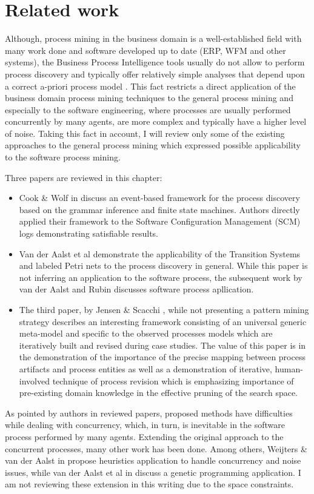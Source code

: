 \chapter{Related work} \label{related.work}
Although, process mining in the business domain is a well-established field with many work done and software developed up to date (ERP, WFM and other systems), the Business Process Intelligence tools usually do not allow to perform process discovery and typically offer relatively simple analyses that depend upon a correct a-priori process model \cite{citeulike:3718014} \cite{citeulike:5044991}. This fact restricts a direct application of the business domain process mining techniques to the general process mining and especially to the software engineering, where processes are usually performed concurrently by many agents, are more complex and typically have a higher level of noise. Taking this fact in account, I will review only some of the existing approaches to the general process mining which expressed possible applicability to the software process mining. 

Three papers are reviewed in this chapter: 
\begin{itemize}
	\item Cook \& Wolf in \cite{citeulike:328044} discuss an event-based framework for the process discovery based on the grammar inference and finite state machines. Authors directly applied their framework to the Software Configuration Management (SCM) logs demonstrating satisfiable results. 
	\item Van der Aalst et al \cite{citeulike:3718014} demonstrate the applicability of the Transition Systems and labeled Petri nets to the process discovery in general. While this paper is not inferring an application to the software process, the subsequent work by van der Aalst and Rubin \cite{citeulike:1885717} discusses software process apllication.
	\item The third paper, by Jensen \& Scacchi \cite{citeulike:5043664}, while not presenting a pattern mining strategy describes an interesting framework consisting of an universal generic meta-model and specific to the observed processes models which are iteratively built and revised during case studies. The value of this paper is in the demonstration of the importance of the precise mapping between process artifacts and process entities as well as a demonstration of iterative, human-involved technique of process revision which is emphasizing importance of pre-existing domain knowledge in the effective pruning of the search space.
\end{itemize}
As pointed by authors in reviewed papers, proposed methods have difficulties while dealing with concurrency, which, in turn, is inevitable in the software process performed by many agents. Extending the original approach to the concurrent processes, many other work has been done. Among others, Weijters \& van der Aalst in \cite{citeulike:5128101} propose heuristics application to handle concurrency and noise issues, while van der Aalst et al in \cite{citeulike:5128101} discuss a genetic programming application. I am not reviewing these extension in this writing due to the space constraints.
